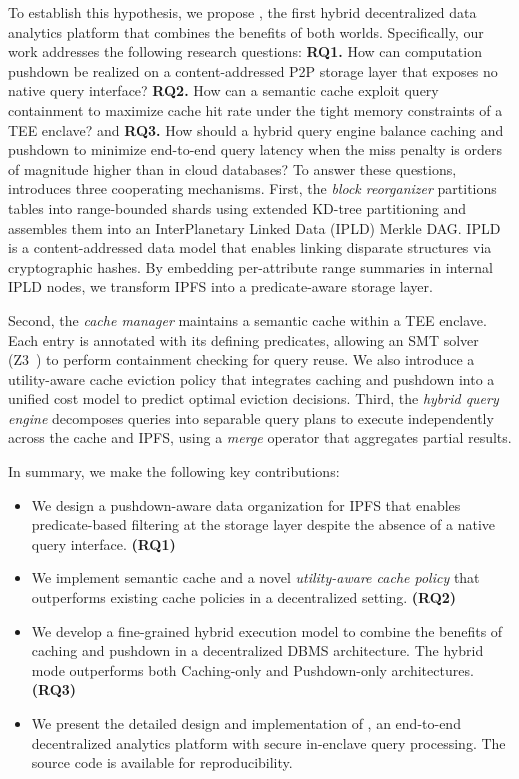 To establish this hypothesis, we propose \ours{}, the first hybrid decentralized data analytics platform that combines the benefits of both worlds. Specifically, our work addresses the following research questions: \textbf{RQ1.} How can computation pushdown be realized on a content-addressed P2P storage layer that exposes no native query interface? \textbf{RQ2.} How can a semantic cache exploit query containment to maximize cache hit rate under the tight memory constraints of a TEE enclave? and \textbf{RQ3.} How should a hybrid query engine balance caching and pushdown to minimize end-to-end query latency when the miss penalty is orders of magnitude higher than in cloud databases?
To answer these questions, \ours{} introduces three cooperating mechanisms. First, the \textit{block reorganizer} partitions tables into range-bounded shards using extended KD-tree partitioning and assembles them into an InterPlanetary Linked Data (IPLD) Merkle DAG\cite{ipld2023spec}. IPLD is a content-addressed data model that enables linking disparate structures via cryptographic hashes. By embedding per-attribute range summaries in internal IPLD nodes, we transform IPFS into a predicate-aware storage layer.

Second, the \textit{cache manager} maintains a semantic cache within a TEE enclave. Each entry is annotated with its defining predicates, allowing an SMT solver (Z3~\cite{de2008z3}) to perform containment checking for query reuse. We also introduce a utility-aware cache eviction policy that integrates caching and pushdown into a unified cost model to predict optimal eviction decisions. Third, the \textit{hybrid query engine} decomposes queries into separable query plans to execute independently across the cache and IPFS, using a \textit{merge} operator that aggregates partial results.

In summary, we make the following key contributions:
\begin{itemize}
    \item We design a pushdown-aware data organization for IPFS that enables predicate-based filtering at the storage layer despite the absence of a native query interface. \textbf{(RQ1)}
    \item We implement semantic cache and a novel \emph{utility-aware cache policy} that outperforms existing cache policies in a decentralized setting. \textbf{(RQ2)}
    \item We develop a fine-grained hybrid execution model to combine the benefits of caching and pushdown in a decentralized DBMS architecture. The hybrid mode outperforms both Caching-only and Pushdown-only architectures. \textbf{(RQ3)}
    \item We present the detailed design and implementation of \ours{}, an end-to-end decentralized analytics platform with secure in-enclave query processing. The source code is available for reproducibility. 
\end{itemize}

